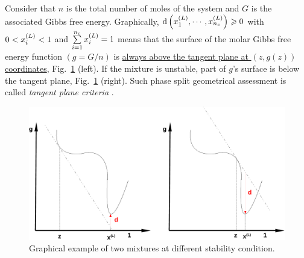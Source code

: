 Consider that $n$ is the total number of moles of the system and $G$ is the associated Gibbs free energy. Graphically, $\d\left(\mfr[x]{1}{L}, \cdots, \mfr[x]{n_{c}}{L}\right) \ge 0$ with $0 < \mfr[x]{i}{L} < 1$ and $\summation_{i=1}^{n_{c}}\mfr[x]{i}{L} = 1$ means that the surface of the molar Gibbs free energy function $\left(g=G/n\right)$ is \underline{always above the tangent plane at $\left(z,g(z)\right)$ coordinates}, Fig.~\ref{Chapter:ThermodynamicFormulation:Fig:PhaseStabilityCriteria} (left). If the mixture is unstable, part of $g$'s surface is below the tangent plane, Fig.~\ref{Chapter:ThermodynamicFormulation:Fig:PhaseStabilityCriteria} (right). Such phase split geometrical assessment is called {\it tangent plane criteria} \citep[see][]{michelsen_1984,baker_1982}.
\begin{figure}[h]\label{Chapter:ThermodynamicFormulation:Fig:PhaseStabilityCriteria}
        \begin{center}
          \includegraphics[width=\columnwidth,clip]{./Figs/StabilityCriteria2}\vspace{-0.5cm}
           \caption{Graphical example of two mixtures at different stability condition.} 
        \end{center}
\end{figure}

